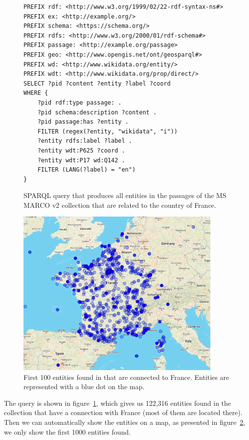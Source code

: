 \begin{figure}
\centering
\begin{lstlisting}
PREFIX rdf: <http://www.w3.org/1999/02/22-rdf-syntax-ns#>
PREFIX ex: <http://example.org/> 
PREFIX schema: <https://schema.org/>
PREFIX rdfs: <http://www.w3.org/2000/01/rdf-schema#>
PREFIX passage: <http://example.org/passage> 
PREFIX geo: <http://www.opengis.net/ont/geosparql#>
PREFIX wd: <http://www.wikidata.org/entity/>
PREFIX wdt: <http://www.wikidata.org/prop/direct/>
SELECT ?pid ?content ?entity ?label ?coord 
WHERE {
	?pid rdf:type passage: .
	?pid schema:description ?content .
	?pid passage:has ?entity .
	FILTER (regex(?entity, "wikidata", "i"))
	?entity rdfs:label ?label .
	?entity wdt:P625 ?coord .
	?entity wdt:P17 wd:Q142 .
	FILTER (LANG(?label) = "en")
}
\end{lstlisting}
\caption{SPARQL query that produces all entities in the passages of the MS MARCO v2 collection that are related to the country of France.}
\label{fig:code_sparql}
\end{figure}

\begin{figure}[!t]
\centering
\includegraphics[width=0.9\textwidth]{imgs/france.png}
\caption{First 100 entities found in that are connected to France. Entities are represented with a blue dot on the map.}
\label{fig:france}
\end{figure}


The query is shown in figure~\ref{fig:code_sparql}, which gives us 122,316 entities found in the collection that have a connection with France (most of them are located there). Then we can automatically show the entities on a map, as presented in figure~\ref{fig:france}, we only show the first 1000 entities found. 

